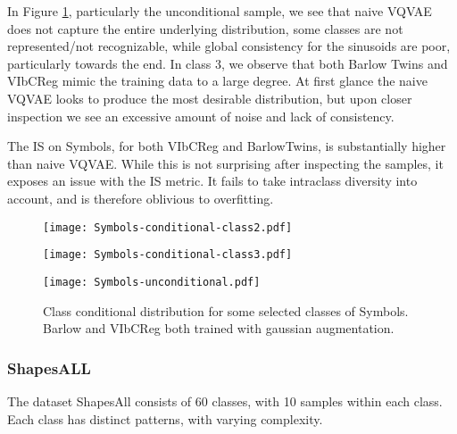 \documentclass[../../thesis.tex]{subfiles}
\begin{document}
In Figure \ref{fig:Gauss_Symbols}, particularly the unconditional sample, we see that naive VQVAE does not capture the entire underlying distribution, some classes are not represented/not recognizable, while global consistency for the sinusoids are poor, particularly towards the end. In class 3, we observe that both Barlow Twins and VIbCReg mimic the training data to a large degree. At first glance the naive VQVAE looks to produce the most desirable distribution, but upon closer inspection we see an excessive amount of noise and lack of consistency.\newline

The IS on Symbols, for both VIbCReg and BarlowTwins, is substantially higher than naive VQVAE. While this is not surprising after inspecting the samples, it exposes an issue with the IS metric. It fails to take intraclass diversity into account, and is therefore oblivious to overfitting. \newline

\begin{figure}[H]
    \centering
    \begin{minipage}[b]{0.32\textwidth}
        \centering
        \texttt{[image: Symbols-conditional-class2.pdf]}
    \end{minipage}
    \begin{minipage}[b]{0.32\textwidth}
        \centering
        \texttt{[image: Symbols-conditional-class3.pdf]}
    \end{minipage}
    \begin{minipage}[b]{0.32\textwidth}
        \centering
        \texttt{[image: Symbols-unconditional.pdf]}
    \end{minipage}
    \caption{Class conditional distribution for some selected classes of Symbols. Barlow and VIbCReg both trained with gaussian augmentation.}
    \label{fig:Gauss_Symbols}
\end{figure}






\subsubsection{ShapesALL}
The dataset ShapesAll consists of 60 classes, with 10 samples within each class. Each class has distinct patterns, with varying complexity.\newline
\end{document}
